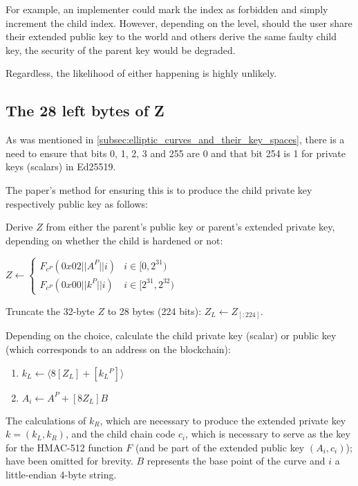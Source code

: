\documentclass[12pt, a4paper, twocolumn]{article}
\begin{document}
For example, an implementer could mark the index as forbidden and simply increment the child index. However, depending on the level, should the user share their extended public key to the world and others derive the same faulty child key, the security of the parent key would be degraded.

Regardless, the likelihood of either happening is highly unlikely.

\subsection{The 28 left bytes of Z}
\label{subsec:the_28_left_bytes_of_z}

As was mentioned in \cref{subsec:elliptic_curves_and_their_key_spaces}, there is a need to ensure that bits 0, 1, 2, 3 and 255 are 0 and that bit 254 is 1 for private keys (scalars) in Ed25519.

The paper's method for ensuring this is to produce the child private key respectively public key as follows:

Derive $Z$ from either the parent's public key or parent's extended private key, depending on whether the child is hardened or not:

$  Z \leftarrow 
  \begin{cases} 
  F_{c^P}(0x02||A^P||i) & i \in  [0, 2^{31}) \\
  F_{c^P}(0x00||k^P||i) & i \in [2^{31}, 2^{32})
  \end{cases}
  $

Truncate the 32-byte $Z$ to 28 bytes (224 bits): $Z_L \leftarrow Z_{[:224]}$.

Depending on the choice, calculate the child private key (scalar) or public key (which corresponds to an address on the blockchain):

\begin{enumerate}[label={}] 
  \item $k_L \leftarrow \langle 8[Z_L]  + [k{_L}^P]\rangle$ 
  \item $A_i \leftarrow A^P + [8Z_L]B$
\end{enumerate}


The calculations of $k_R$, which are necessary to produce the extended private key $k = (k_L, k_R)$, and the child chain code $c_i$, which is necessary to serve as the key for the HMAC-512 function $F$ (and be part of the extended public key $(A_i, c_i)$); have been omitted for brevity. $B$ represents the base point of the curve and $i$ a little-endian 4-byte string.
\end{document}
